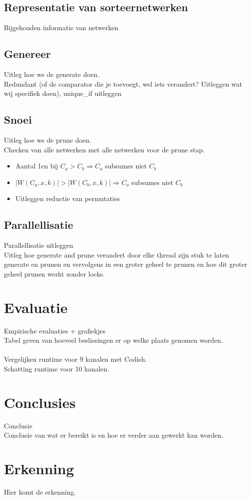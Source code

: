 \documentclass{article}
\begin{document}
\subsection{Representatie van sorteernetwerken}
Bijgehouden informatie van netwerken

\subsection{Genereer}
Uitleg hoe we de generate doen.\\
Redundant (of de comparator die je toevoegt, wel iets verandert? Uitleggen wat wij specifiek doen), unique\_if uitleggen

\subsection{Snoei}
Uitleg hoe we de prune doen.\\
Checken  van alle netwerken met alle netwerken voor de prune stap.
\begin{itemize}
\item Aantal 1en bij $C_a > C_b \Rightarrow C_a$ subsumes niet $C_b$ 
\item $|W(C_a, x, k)| > |W(C_b, x, k)| \Rightarrow C_a$ subsumes niet $C_b$
\item Uitleggen reductie van permutaties
\end{itemize}

\subsection{Parallellisatie}
Parallellisatie uitleggen\\
Uitleg hoe generate and prune verandert door elke thread zijn stuk te laten generate en prunen en vervolgens in een groter geheel te prunen en hoe dit groter geheel prunen werkt zonder locks.


\section{Evaluatie}
Empirische evaluaties + grafiekjes\\
Tabel geven van hoeveel beslissingen er op welke plaats genomen worden.\\ \\
Vergelijken runtime voor 9 kanalen met Codish.\\
Schatting runtime voor 10 kanalen.

\section{Conclusies}
Conclusie\\
Conclusie van wat er bereikt is en hoe er verder aan gewerkt kan worden.

\section*{Erkenning}
Hier komt de erkenning.



%
%
\end{document}
